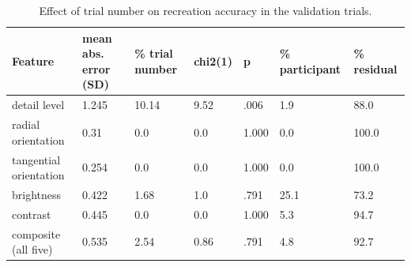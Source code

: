\begin{table}[htbp]
\centering
\small
\caption{Effect of trial number on recreation accuracy in the validation trials.}
\label{tab:S5.3}
\begin{tabular}{lllllll}
\hline
Feature & mean abs. error (SD) & \% trial number & chi2(1) & p & \% participant & \% residual \\
\hline
detail level & 1.245 & 10.14 & 9.52 & .006 & 1.9 & 88.0 \\
radial orientation & 0.31 & 0.0 & 0.0 & 1.000 & 0.0 & 100.0 \\
tangential orientation & 0.254 & 0.0 & 0.0 & 1.000 & 0.0 & 100.0 \\
brightness & 0.422 & 1.68 & 1.0 & .791 & 25.1 & 73.2 \\
contrast & 0.445 & 0.0 & 0.0 & 1.000 & 5.3 & 94.7 \\
composite (all five) & 0.535 & 2.54 & 0.86 & .791 & 4.8 & 92.7 \\
\hline
\end{tabular}
\end{table}